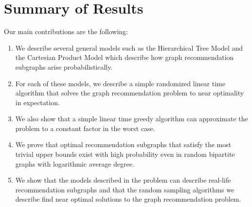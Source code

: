 \section{Summary of Results}
Our main contributions are the following:
\begin{enumerate}

\item We describe several general models such as the Hierarchical Tree
  Model and the Cartesian Product Model which describe how graph
  recommendation subgraphs arise probabilistically.

\item For each of these models, we describe a simple randomized linear
  time algorithm that solves the graph recommendation problem to near
  optimality in expectation.

\item We also show that a simple linear time greedy algorithm can
  approximate the problem to a constant factor in the worst case.

\item We prove that optimal recommendation subgraphs that satisfy the
  most trivial upper bounds exist with high probability even in random
  bipartite graphs with logarithmic average degree.

\item We show that the models described in the problem can describe
  real-life recommendation subgraphs and that the random sampling
  algorithms we describe find near optimal solutions to the graph
  recommendation problem.

\end{enumerate}